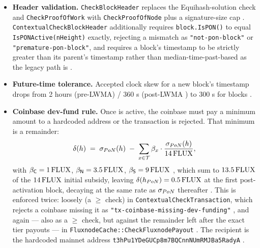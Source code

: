 \begin{itemize}
\item \textbf{Header validation.} \texttt{Check\allowbreak{}Block\allowbreak{}Header} replaces the Equihash-solution check and
\texttt{Check\allowbreak{}Proof\allowbreak{}Of\allowbreak{}Work} with \texttt{Check\allowbreak{}Proof\allowbreak{}Of\allowbreak{}Node} plus a signature-size cap
\shipped {}. \texttt{Contextual\allowbreak{}Check\allowbreak{}Block\allowbreak{}Header} additionally
requires \texttt{block.IsPON()} to equal \texttt{Is\allowbreak{}PONActive(n\allowbreak{}Height)} exactly, rejecting a mismatch
as \texttt{"not-\allowbreak{}pon-\allowbreak{}block"} or \texttt{"premature-\allowbreak{}pon-\allowbreak{}block"}, and requires a \PoN block's timestamp to
be strictly greater than its parent's timestamp rather than median-time-past-based as the legacy path
is \shipped {}.

\item \textbf{Future-time tolerance.} Accepted clock skew for a new block's timestamp drops from
2 hours (pre-LWMA) / 360 s (post-LWMA \PoW) to 300 s for \PoN blocks
\shipped {}.

\item \textbf{Coinbase dev-fund rule.} Once \PoN is active, the coinbase must pay a minimum amount to a
hardcoded address or the transaction is rejected. That minimum is a remainder:
\[
\delta(h) \;=\; \sigma_{PoN}(h) \;-\; \sum_{x \in \mathcal{T}} \beta_{x} \cdot \frac{\sigma_{PoN}(h)}{14\,\mathrm{FLUX}},
\]
with $\beta_{\mathsf{C}} = 1\,\mathrm{FLUX}$, $\beta_{\mathsf{N}} = 3.5\,\mathrm{FLUX}$, $\beta_{\mathsf{S}} = 9\,\mathrm{FLUX}$
\shipped {}, which sum to $13.5\,\mathrm{FLUX}$ of the $14\,\mathrm{FLUX}$ initial
subsidy, leaving $\delta(h_{PoN}) = 0.5\,\mathrm{FLUX}$ at the first post-activation block, decaying at the same
rate as $\sigma_{PoN}$ thereafter \shipped {}. This is enforced
twice: loosely (a $\ge$ check) in \texttt{Contextual\allowbreak{}Check\allowbreak{}Transaction}, which rejects a coinbase missing
it as \texttt{"tx-\allowbreak{}coinbase-\allowbreak{}missing-\allowbreak{}dev-\allowbreak{}funding"} \shipped {},
and again --- also as a $\ge$ check, but against the remainder left after the exact tier payouts --- in \texttt{Fluxnode\allowbreak{}Cache::\allowbreak{}Check\allowbreak{}Fluxnode\allowbreak{}Payout}
\shipped {}. The recipient is the hardcoded mainnet
address \texttt{t3h\allowbreak{}Pu1YDe\allowbreak{}GUCp8m7BQCnn\allowbreak{}NUm\allowbreak{}RMJBa5Rady\allowbreak{}A} \shipped {}.
\end{itemize}

